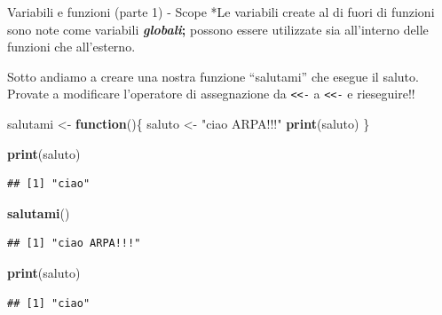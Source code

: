 \documentclass[
  ignorenonframetext,
]{beamer}
\newenvironment{Shaded}{\begin{snugshade}}{\end{snugshade}}
\newcommand{\ControlFlowTok}[1]{\textcolor[rgb]{0.13,0.29,0.53}{\textbf{#1}}}
\newcommand{\FunctionTok}[1]{\textcolor[rgb]{0.13,0.29,0.53}{\textbf{#1}}}
\newcommand{\NormalTok}[1]{#1}
\newcommand{\OtherTok}[1]{\textcolor[rgb]{0.56,0.35,0.01}{#1}}
\newcommand{\StringTok}[1]{\textcolor[rgb]{0.31,0.60,0.02}{#1}}
\begin{document}
\begin{frame}[fragile]{Variabili e funzioni (parte 1) - Scope}
\protect\hypertarget{variabili-e-funzioni-parte-1---scope}{}
*Le variabili create al di fuori di funzioni sono note come variabili
\textbf{\emph{globali};} possono essere utilizzate sia all'interno delle
funzioni che all'esterno.

Sotto andiamo a creare una nostra funzione ``salutami'' che esegue il
saluto. Provate a modificare l'operatore di assegnazione da
\texttt{\textless{}\textless{}-} a \texttt{\textless{}\textless{}-} e
rieseguire!!

\begin{Shaded}
\begin{Highlighting}[]
\NormalTok{salutami }\OtherTok{\textless{}{-}} \ControlFlowTok{function}\NormalTok{()\{}
\NormalTok{  saluto }\OtherTok{\textless{}{-}} \StringTok{"ciao ARPA!!!"}
  \FunctionTok{print}\NormalTok{(saluto)}
\NormalTok{\}}

\FunctionTok{print}\NormalTok{(saluto)}
\end{Highlighting}
\end{Shaded}

\begin{verbatim}
## [1] "ciao"
\end{verbatim}

\begin{Shaded}
\begin{Highlighting}[]
\FunctionTok{salutami}\NormalTok{()}
\end{Highlighting}
\end{Shaded}

\begin{verbatim}
## [1] "ciao ARPA!!!"
\end{verbatim}

\begin{Shaded}
\begin{Highlighting}[]
\FunctionTok{print}\NormalTok{(saluto)}
\end{Highlighting}
\end{Shaded}

\begin{verbatim}
## [1] "ciao"
\end{verbatim}
\end{frame}
\end{document}

